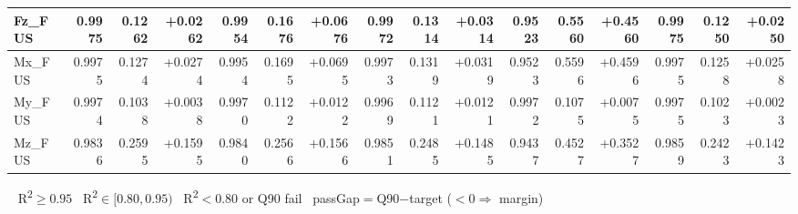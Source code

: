 \documentclass[9pt,a4paper]{article}
\begin{document}
\begin{minipage}{\linewidth}
{\begin{tabular}{l|rrr|rrr|rrr|rrr|rrr|}
  Fz\_FUS & \cellcolor{r2green}0.9975 & \cellcolor{failred}0.1262 & \cellcolor{failred}+0.0262 & \cellcolor{r2green}0.9954 & \cellcolor{failred}0.1676 & \cellcolor{failred}+0.0676 & \cellcolor{r2green}0.9972 & \cellcolor{failred}0.1314 & \cellcolor{failred}+0.0314 & \cellcolor{r2green}0.9523 & \cellcolor{failred}0.5560 & \cellcolor{failred}+0.4560 & \cellcolor{r2green}0.9975 & \cellcolor{failred}0.1250 & \cellcolor{failred}+0.0250 \\ \hline
  Mx\_FUS & \cellcolor{r2green}0.9975 & \cellcolor{failred}0.1274 & \cellcolor{failred}+0.0274 & \cellcolor{r2green}0.9954 & \cellcolor{failred}0.1695 & \cellcolor{failred}+0.0695 & \cellcolor{r2green}0.9973 & \cellcolor{failred}0.1319 & \cellcolor{failred}+0.0319 & \cellcolor{r2green}0.9523 & \cellcolor{failred}0.5596 & \cellcolor{failred}+0.4596 & \cellcolor{r2green}0.9975 & \cellcolor{failred}0.1258 & \cellcolor{failred}+0.0258 \\ \hline
  My\_FUS & \cellcolor{r2green}0.9974 & \cellcolor{failred}0.1038 & \cellcolor{failred}+0.0038 & \cellcolor{r2green}0.9970 & \cellcolor{failred}0.1122 & \cellcolor{failred}+0.0122 & \cellcolor{r2green}0.9969 & \cellcolor{failred}0.1121 & \cellcolor{failred}+0.0121 & \cellcolor{r2green}0.9972 & \cellcolor{failred}0.1075 & \cellcolor{failred}+0.0075 & \cellcolor{r2green}0.9975 & \cellcolor{failred}0.1023 & \cellcolor{failred}+0.0023 \\ \hline
  Mz\_FUS & \cellcolor{r2green}0.9836 & \cellcolor{failred}0.2595 & \cellcolor{failred}+0.1595 & \cellcolor{r2green}0.9840 & \cellcolor{failred}0.2566 & \cellcolor{failred}+0.1566 & \cellcolor{r2green}0.9851 & \cellcolor{failred}0.2485 & \cellcolor{failred}+0.1485 & \cellcolor{r2amber}0.9437 & \cellcolor{failred}0.4527 & \cellcolor{failred}+0.3527 & \cellcolor{r2green}0.9859 & \cellcolor{failred}0.2423 & \cellcolor{failred}+0.1423 \\ \hline
\end{tabular}
}
\par\vspace{4pt}
{\footnotesize \colorbox{r2green}{\ } R\textsuperscript{2}$\!\geq\!0.95$\enspace \colorbox{r2amber}{\ } R\textsuperscript{2}$\!\in[0.80,0.95)$\enspace \colorbox{failred}{\ } R\textsuperscript{2}$\!<\!0.80$ or Q90 fail\enspace \colorbox{passgreen}{\ } pass\enspace Gap$=$Q90$-$target ($<\!0\Rightarrow$ margin)}
\end{minipage}
\end{document}
